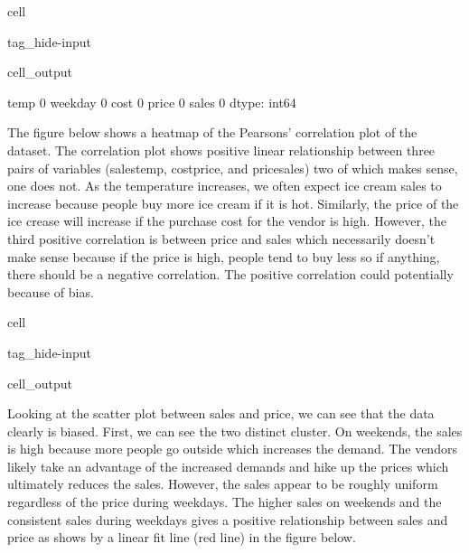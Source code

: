 \documentclass[letterpaper,10pt,english]{jupyterBook}
\begin{document}
\begin{sphinxuseclass}{cell}
\begin{sphinxuseclass}{tag_hide-input}\begin{sphinxVerbatimOutput}

\begin{sphinxuseclass}{cell_output}
\begin{sphinxVerbatim}[commandchars=\\\{\}]
temp       0
weekday    0
cost       0
price      0
sales      0
dtype: int64
\end{sphinxVerbatim}

\end{sphinxuseclass}\end{sphinxVerbatimOutput}

\end{sphinxuseclass}
\end{sphinxuseclass}
\sphinxAtStartPar
The figure below shows a heatmap of the Pearsons’ correlation plot of the dataset. The correlation plot shows positive linear relationship between three pairs of variables (sales\sphinxhyphen{}temp, cost\sphinxhyphen{}price, and price\sphinxhyphen{}sales)\sphinxhyphen{} two of which makes sense, one does not. As the temperature increases, we often expect ice cream sales to increase because people buy more ice cream if it is hot. Similarly, the price of the ice crease will increase if the purchase cost for the vendor is high. However, the third positive correlation is between price and sales which necessarily doesn’t make sense because if the price is high, people tend to buy less so if anything, there should be a negative correlation. The positive correlation could potentially because of bias.

\begin{sphinxuseclass}{cell}
\begin{sphinxuseclass}{tag_hide-input}\begin{sphinxVerbatimOutput}

\begin{sphinxuseclass}{cell_output}
\noindent{}

\end{sphinxuseclass}\end{sphinxVerbatimOutput}

\end{sphinxuseclass}
\end{sphinxuseclass}
\sphinxAtStartPar
Looking at the scatter plot between sales and price, we can see that the data clearly is biased. First, we can see the two distinct cluster. On weekends, the sales is high because more people go outside which increases the demand. The vendors likely take an advantage of the increased demands and hike up the prices which ultimately reduces the sales. However, the sales appear to be roughly uniform regardless of the price during weekdays. The higher sales on weekends and the consistent sales during weekdays gives a positive relationship between sales and price as shows by a linear fit line (red line) in the figure below.
\end{document}
